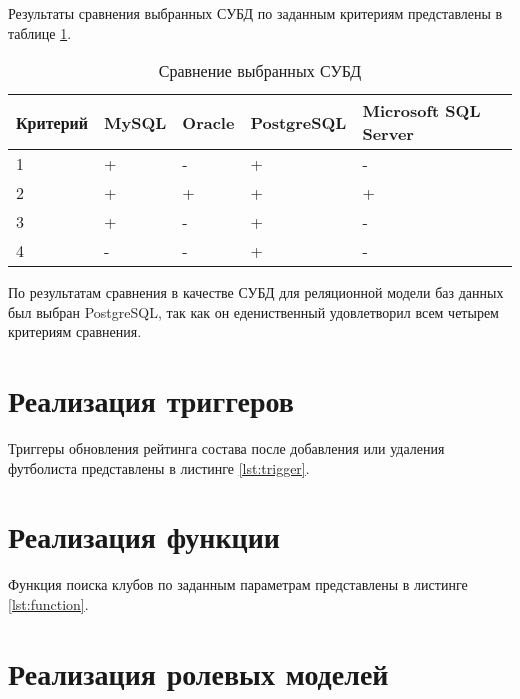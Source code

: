 Результаты сравнения выбранных СУБД по заданным критериям представлены в таблице \ref{tbl:compare_DBMS}.

\captionsetup{justification=raggedleft,singlelinecheck=off}
\begin{table}[H]
    \centering
	\caption{Сравнение выбранных СУБД}
    \label{tbl:compare_DBMS}
	\begin{tabular}{|l|l|l|l|l|}
        \hline
        \textbf{Критерий} & \textbf{MySQL} & \textbf{Oracle} & \textbf{PostgreSQL} & \textbf{Microsoft SQL Server} \\ \hline

        1 & + & - & + & - \\ \hline
        2 & + & + & + & + \\ \hline
        3 & + & - & + & - \\ \hline
        4 & - & - & + & - \\ \hline

    \end{tabular}
\end{table}

По результатам сравнения в качестве СУБД для реляционной модели баз данных был выбран PostgreSQL, так как он едениственный удовлетворил всем четырем критериям сравнения.

\section{Реализация триггеров}

Триггеры обновления рейтинга состава после добавления или удаления футболиста представлены в листинге \ref{lst:trigger}.


\section{Реализация функции}

Функция поиска клубов по заданным параметрам представлены в листинге \ref{lst:function}.


\section{Реализация ролевых моделей}

